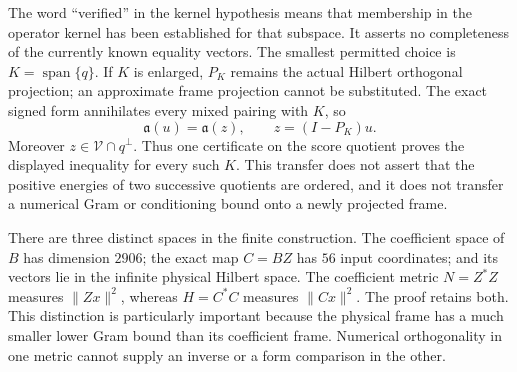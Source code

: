 \documentclass[12pt]{article}
\theoremstyle{remark}\newtheorem{remark}[theorem]{Remark}
\begin{document}
The word ``verified'' in the kernel hypothesis means that membership
in the operator kernel has been established for that subspace. It
asserts no completeness of the currently known equality vectors.
The smallest permitted choice is $K=\operatorname{span}\{q\}$.
If $K$ is enlarged, $P_K$ remains the actual Hilbert orthogonal
projection; an approximate frame projection cannot be substituted.
The exact signed form annihilates every mixed pairing with $K$, so
\[
 \mathfrak a(u)=\mathfrak a(z),\qquad z=(I-P_K)u.
\]
Moreover $z\in\mathcal V\cap q^\perp$. Thus one certificate on the
score quotient proves the displayed inequality for every such $K$.
This transfer does not assert that the positive energies of two
successive quotients are ordered, and it does not transfer a numerical
Gram or conditioning bound onto a newly projected frame.

There are three distinct spaces in the finite construction. The
coefficient space of $B$ has dimension $2906$; the exact map $C=BZ$
has $56$ input coordinates; and its vectors lie in the infinite
physical Hilbert space. The coefficient metric $N=Z^*Z$ measures
$\|Zx\|^2$, whereas $H=C^*C$ measures $\|Cx\|^2$. The proof retains
both. This distinction is particularly important because the physical
frame has a much smaller lower Gram bound than its coefficient frame.
Numerical orthogonality in one metric cannot supply an inverse or a
form comparison in the other.
\end{document}

